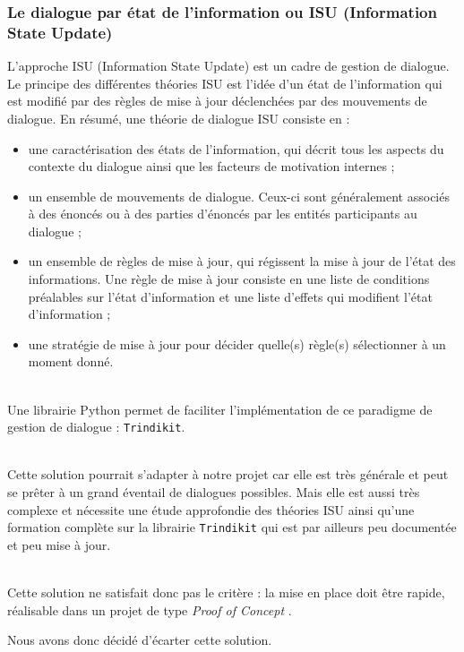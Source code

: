 \subsubsection{Le dialogue par état de l'information ou ISU (Information State Update)}

L'approche ISU (Information State Update) est un cadre de gestion de dialogue. Le principe des différentes théories ISU est l'idée d'un état de l'information qui est modifié par des règles de mise à jour déclenchées par des mouvements de dialogue. En résumé, une théorie de dialogue ISU consiste en :
\begin{itemize}
	\item une caractérisation des états de l'information, qui décrit tous les aspects du contexte du dialogue ainsi que les facteurs de motivation internes ;
	\item un ensemble de mouvements de dialogue. Ceux-ci sont généralement associés à des énoncés ou à des parties d'énoncés par les entités participants au dialogue ;
	\item un ensemble de règles de mise à jour, qui régissent la mise à jour de l'état des informations. Une règle de mise à jour consiste en une liste de conditions préalables sur l'état d'information et une liste d'effets qui modifient l'état d'information ;
	\item une stratégie de mise à jour pour décider quelle(s) règle(s) sélectionner à un moment donné.
\end{itemize}

~\\\indent
Une librairie Python permet de faciliter l'implémentation de ce paradigme de gestion de dialogue : \texttt{Trindikit}. 

~\\\indent
Cette solution pourrait s'adapter à notre projet car elle est très générale et peut se prêter à un grand éventail de dialogues possibles. Mais elle est aussi très complexe et nécessite une étude approfondie des théories ISU ainsi qu'une formation complète sur la librairie \texttt{Trindikit} qui est par ailleurs peu documentée et peu mise à jour. 

~\\\indent
Cette solution ne satisfait donc pas le critère : \og la mise en place doit être rapide, réalisable dans un projet de type \textit{Proof of Concept} \fg. 

Nous avons donc décidé d'écarter cette solution.

\FloatBarrier

